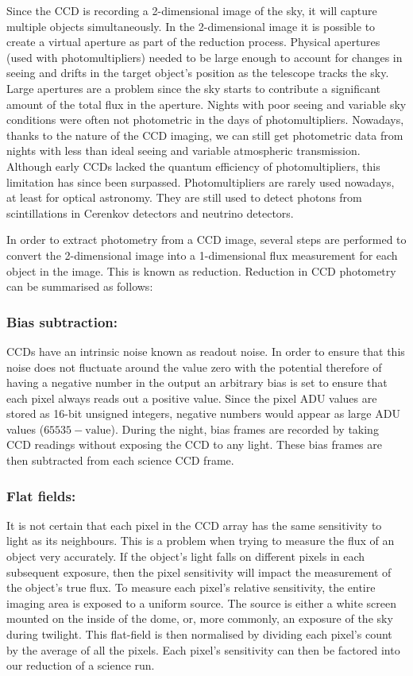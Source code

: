 Since the CCD is recording a 2-dimensional image of the sky, it will capture multiple objects simultaneously. In the 2-dimensional image it is possible to create a virtual aperture as part of the reduction process. Physical apertures (used with photomultipliers) needed to be large enough to account for changes in seeing and drifts in the target object's position as the telescope tracks the sky. Large apertures are a problem since the sky starts to contribute a significant amount of the total flux in the aperture. Nights with poor seeing and variable sky conditions were often not photometric in the days of photomultipliers. Nowadays, thanks to the nature of the CCD imaging, we can still get photometric data from nights with less than ideal seeing and variable atmospheric transmission.  Although early CCDs lacked the quantum efficiency of photomultipliers, this limitation has since been surpassed. Photomultipliers are rarely used nowadays, at least for optical astronomy. They are still used to detect photons from scintillations in Cerenkov detectors and neutrino detectors.  

In order to extract photometry from a CCD image, several steps are performed to convert the 2-dimensional image into a 1-dimensional flux measurement for each object in the image. This is known as reduction. Reduction in CCD photometry can be summarised as follows: 

\subsubsection{Bias subtraction:}
CCDs have an intrinsic noise known as readout noise. In order to ensure that this noise does not fluctuate around the value zero with the potential therefore of having a negative number in the output an arbitrary bias is set to ensure that each pixel always reads out a positive value. Since the pixel ADU values are stored as 16-bit unsigned integers, negative numbers would appear as large ADU values ($65535 - \mbox{value}$). During the night, bias frames are recorded by taking CCD readings without exposing the CCD to any light. These bias frames are then subtracted from each science CCD frame. 

\subsubsection{Flat fields:}
It is not certain that each pixel in the CCD array has the same sensitivity to light as its neighbours. This is a problem when trying to measure the flux of an object very accurately. If the object's light falls on different pixels in each subsequent exposure, then the pixel sensitivity will impact the measurement of the object's true flux. To measure each pixel's relative sensitivity, the entire imaging area is exposed to a uniform source. The source is either a white screen mounted on the inside of the dome, or, more commonly, an exposure of the sky during twilight. This flat-field is then normalised by dividing each pixel's count by the average of all the pixels. Each pixel's sensitivity can then be factored into our reduction of a science run. 

